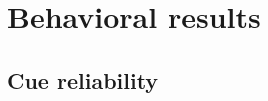 \documentclass[9pt,lineno,doublespacing]{elife}
\begin{document}
\section{Behavioral results}

\subsection{Cue reliability}




\end{document}
